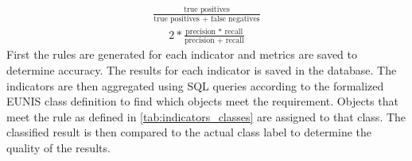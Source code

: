 \documentclass[authoryear, review,12pt,number]{elsarticle}
\begin{document}
\begin{equation}
\begin{align*}
    \frac{\text{true positives}}{\text{true positives + false negatives}}
\end{align*}
\label{eq:recall}
\end{equation}
\begin{equation}
\begin{align*}
    2 * \frac{\text{precision * recall}}{\text{precision + recall}}
\end{align*}
\label{eq:fscore}
\end{equation}
First the rules are generated for each indicator and metrics are saved to 
determine accuracy. The results for each indicator is saved in the 
database. The indicators are then aggregated using SQL queries according to the 
formalized EUNIS class definition to find which objects meet the requirement. 
Objects that meet the rule as defined in \ref{tab:indicators_classes} are 
assigned to that class. The classified result is then compared to the actual 
class label to determine the quality of the results.
\end{document}
